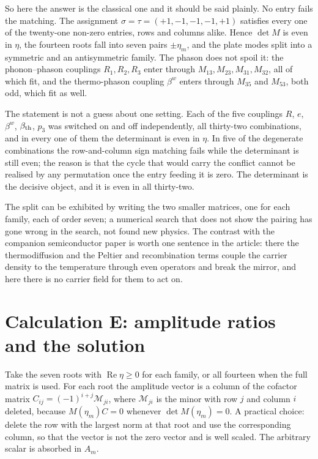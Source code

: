 \documentclass[11pt]{article}
\makeatletter
\newif\ifshowworked
\newenvironment{worked}{%
  \ifshowworked\par\smallskip\noindent\textit{Working.}\par\smallskip\else
  \setbox\z@\vbox\bgroup\fi}{\ifshowworked\par\smallskip\else\egroup\fi}
\makeatother
\begin{document}
So here the answer is the classical one and it should be said plainly. No entry fails the
matching. The assignment $\sigma=\tau=(+1,-1,-1,-1,+1)$ satisfies every one of the twenty-one non-zero
entries, rows and columns alike. Hence $\det M$ is even in $\eta$, the fourteen roots fall into seven
pairs $\pm\eta_m$, and the plate modes split into a symmetric and an antisymmetric family. The phason does
not spoil it: the phonon--phason couplings $R_1,R_2,R_3$ enter through $M_{13},M_{23},M_{31},M_{32}$, all
of which fit, and the thermo-phason coupling $\beta^{w}$ enters through $M_{35}$ and $M_{53}$, both odd,
which fit as well.

The statement is not a guess about one setting. Each of the five couplings $R$, $e$, $\beta^{w}$,
$\beta_{\rm th}$, $p_3$ was switched on and off independently, all thirty-two combinations, and in every
one of them the determinant is even in $\eta$. In five of the degenerate combinations the row-and-column
sign matching fails while the determinant is still even; the reason is that the cycle that would carry the
conflict cannot be realised by any permutation once the entry feeding it is zero. The determinant is the
decisive object, and it is even in all thirty-two.

The split can be exhibited by writing the two smaller matrices, one for each family, each of order seven;
a numerical search that does not show the pairing has gone wrong in the search, not found new physics. The
contrast with the companion semiconductor paper is worth one sentence in the article: there the
thermodiffusion and the Peltier and recombination terms couple the carrier density to the temperature
through even operators and break the mirror, and here there is no carrier field for them to act on.

\section{Calculation E: amplitude ratios and the solution}\label{sec:calcE}

\begin{worked}
Take the seven roots with $\operatorname{Re}\eta\ge0$ for each family, or all fourteen when the full matrix
is used. For each root the amplitude vector is a column of the cofactor matrix
$C_{ij}=(-1)^{i+j}\mathcal M_{ji}$, where $\mathcal M_{ji}$ is the minor with row $j$ and column $i$
deleted, because $M(\eta_m)C=0$ whenever $\det M(\eta_m)=0$.
A practical choice: delete the row with the largest norm at that root and use the corresponding column, so
that the vector is not the zero vector and is well scaled. The arbitrary scalar is absorbed in $A_m$.
\end{worked}
\end{document}
